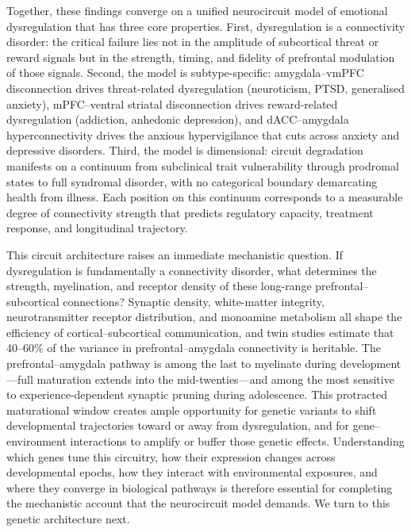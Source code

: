 Together, these findings converge on a unified neurocircuit model of
emotional dysregulation that has three core properties.  First,
dysregulation is a connectivity disorder: the critical failure lies not in
the amplitude of subcortical threat or reward signals but in the strength,
timing, and fidelity of prefrontal modulation of those signals.  Second,
the model is subtype-specific: amygdala--vmPFC disconnection drives
threat-related dysregulation (neuroticism, PTSD, generalised anxiety),
mPFC--ventral striatal disconnection drives reward-related dysregulation
(addiction, anhedonic depression), and dACC--amygdala hyperconnectivity
drives the anxious hypervigilance that cuts across anxiety and depressive
disorders.  Third, the model is dimensional: circuit degradation manifests
on a continuum from subclinical trait vulnerability through prodromal states
to full syndromal disorder, with no categorical boundary demarcating health
from illness.  Each position on this continuum corresponds to a measurable
degree of connectivity strength that predicts regulatory capacity,
treatment response, and longitudinal trajectory.

This circuit architecture raises an immediate mechanistic question.  If
dysregulation is fundamentally a connectivity disorder, what determines the
strength, myelination, and receptor density of these long-range
prefrontal--subcortical connections?  Synaptic density, white-matter
integrity, neurotransmitter receptor distribution, and monoamine
metabolism all shape the efficiency of cortical--subcortical
communication, and twin studies estimate that 40--60\% of the variance
in prefrontal--amygdala connectivity is heritable.\cite{polderman2015}  The
prefrontal--amygdala pathway is among the last to myelinate during
development---full maturation extends into the mid-twenties---and among
the most sensitive to experience-dependent synaptic pruning during
adolescence.  This protracted maturational window creates ample
opportunity for genetic variants to shift developmental trajectories
toward or away from dysregulation, and for gene--environment interactions
to amplify or buffer those genetic effects.  Understanding which genes
tune this circuitry, how their expression changes across developmental
epochs, how they interact with environmental exposures, and where they
converge in biological pathways is therefore essential for completing the
mechanistic account that the neurocircuit model demands.  We turn to
this genetic architecture next.
